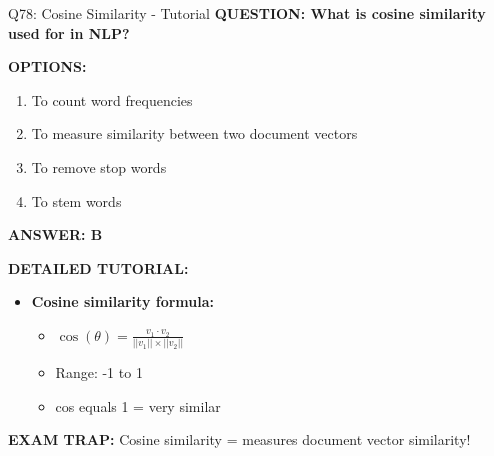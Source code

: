 \documentclass[8pt]{beamer}
\begin{document}
	\begin{frame}{Q78: Cosine Similarity - Tutorial}
		\fontsize{6.5}{7.5}\selectfont
		\textbf{QUESTION: What is cosine similarity used for in NLP?}
		
		\vspace{0.1cm}
		\textbf{OPTIONS:}
		\begin{enumerate}
			\item To count word frequencies
			\item To measure similarity between two document vectors
			\item To remove stop words
			\item To stem words
		\end{enumerate}
		
		\vspace{0.1cm}
		\textcolor{myblue}{\textbf{ANSWER: B}}
		
		\vspace{0.1cm}
		\textbf{DETAILED TUTORIAL:}
		\begin{itemize}
			\item \textbf{Cosine similarity formula:}
			\begin{itemize}
				\item $\cos(\theta) = \frac{v_1 \cdot v_2}{||v_1|| \times ||v_2||}$
				\item Range: -1 to 1
				\item cos equals 1 = very similar
			\end{itemize}
		\end{itemize}
		
		\textcolor{myred}{\textbf{EXAM TRAP:}} Cosine similarity = \textcolor{myblue}{measures document vector similarity}!
	\end{frame}
	
\end{document}
